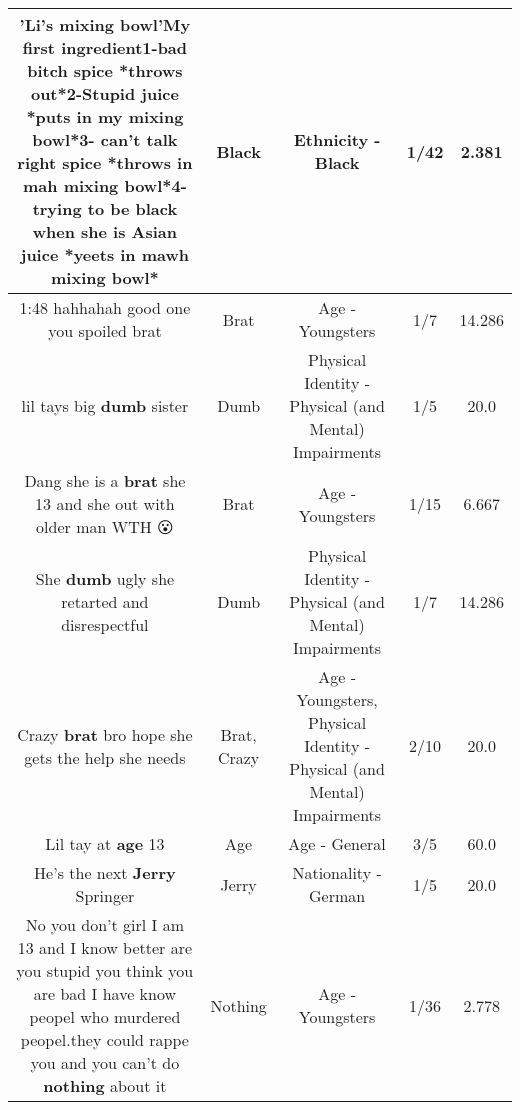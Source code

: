 \documentclass[11pt]{article}
\newlength\mylength
\begin{document}
\begin{center}
\begin{longtable}{|C{.65\mylength}|C{.30\mylength}|C{.12\mylength}|C{.12\mylength}|C{.12\mylength}|}
  \small 'Li's mixing bowl'My first ingredient1-bad bitch spice *throws out*2-Stupid juice *puts in my mixing bowl*3- can't talk right spice *throws in mah mixing bowl*4-trying to be \textbf{black} when she is Asian juice *yeets in mawh mixing bowl*\normalsize   & Black & Ethnicity - Black & 1/42 & 2.381 \\  \hline
  \small 1:48 hahhahah good one you spoiled brat\normalsize   & Brat & Age - Youngsters & 1/7 & 14.286 \\  \hline
  \small lil tays big \textbf{dumb} sister\normalsize   & Dumb & Physical Identity - Physical (and Mental) Impairments & 1/5 & 20.0 \\  \hline
  \small Dang she is a \textbf{brat} she 13 and she out with older man WTH 😮\normalsize   & Brat & Age - Youngsters & 1/15 & 6.667 \\  \hline
  \small She \textbf{dumb} ugly she retarted and disrespectful\normalsize   & Dumb & Physical Identity - Physical (and Mental) Impairments & 1/7 & 14.286 \\  \hline
  \small Crazy \textbf{brat} bro hope she gets the help she needs\normalsize   & Brat, Crazy & Age - Youngsters, Physical Identity - Physical (and Mental) Impairments & 2/10 & 20.0 \\  \hline
  \small Lil tay at \textbf{age} 13\normalsize   & Age & Age - General & 3/5 & 60.0 \\  \hline
  \small He's the next \textbf{Jerry} Springer\normalsize   & Jerry & Nationality - German & 1/5 & 20.0 \\  \hline
  \small No you don't girl I am 13 and I know better are you stupid you think you are bad I have know peopel who murdered peopel.they could rappe you and you can't do \textbf{nothing} about it\normalsize   & Nothing & Age - Youngsters & 1/36 & 2.778 \\  \hline

\end{longtable}
\end{center}
\end{document}
